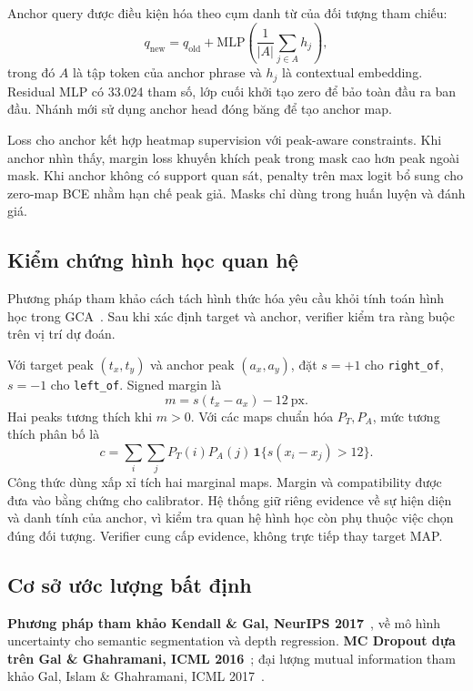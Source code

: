 \documentclass[12pt,a4paper]{article}
\begin{document}
Anchor query được điều kiện hóa theo cụm danh từ của đối tượng tham chiếu:
\begin{equation}
q_{\mathrm{new}}=q_{\mathrm{old}}+\mathrm{MLP}\!\left(\frac{1}{|A|}\sum_{j\in A}h_j\right),
\end{equation}
trong đó $A$ là tập token của anchor phrase và $h_j$ là contextual embedding. Residual MLP có 33.024 tham số, lớp cuối khởi tạo zero để bảo toàn đầu ra ban đầu. Nhánh mới sử dụng anchor head đóng băng để tạo anchor map.

Loss cho anchor kết hợp heatmap supervision với peak-aware constraints. Khi anchor nhìn thấy, margin loss khuyến khích peak trong mask cao hơn peak ngoài mask. Khi anchor không có support quan sát, penalty trên max logit bổ sung cho zero-map BCE nhằm hạn chế peak giả. Masks chỉ dùng trong huấn luyện và đánh giá.

\subsection{Kiểm chứng hình học quan hệ}
Phương pháp tham khảo cách tách hình thức hóa yêu cầu khỏi tính toán hình học trong GCA~\cite{gca}. Sau khi xác định target và anchor, verifier kiểm tra ràng buộc trên vị trí dự đoán.

Với target peak $(t_x,t_y)$ và anchor peak $(a_x,a_y)$, đặt $s=+1$ cho \texttt{right\_of}, $s=-1$ cho \texttt{left\_of}. Signed margin là
\begin{equation}
m=s(t_x-a_x)-12\ \mathrm{px}.
\end{equation}
Hai peaks tương thích khi $m>0$. Với các maps chuẩn hóa $P_T,P_A$, mức tương thích phân bố là
\begin{equation}\label{eq:relation}
c=\sum_i\sum_jP_T(i)P_A(j)\,\mathbf1\{s(x_i-x_j)>12\}.
\end{equation}
Công thức dùng xấp xỉ tích hai marginal maps. Margin và compatibility được đưa vào bằng chứng cho calibrator. Hệ thống giữ riêng evidence về sự hiện diện và danh tính của anchor, vì kiểm tra quan hệ hình học còn phụ thuộc việc chọn đúng đối tượng. Verifier cung cấp evidence, không trực tiếp thay target MAP.

\subsection{Cơ sở ước lượng bất định}
\textbf{Phương pháp tham khảo Kendall \& Gal, NeurIPS 2017}~\cite{kendall2017}, về mô hình uncertainty cho semantic segmentation và depth regression. \textbf{MC Dropout dựa trên Gal \& Ghahramani, ICML 2016}~\cite{gal2016}; đại lượng mutual information tham khảo Gal, Islam \& Ghahramani, ICML 2017~\cite{gal2017}.
\end{document}
